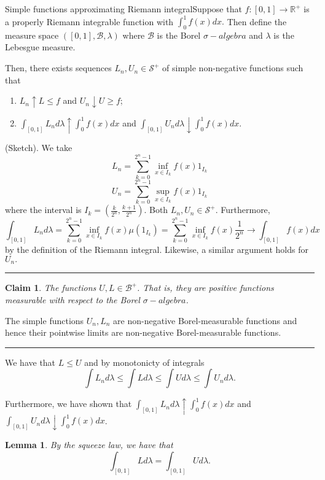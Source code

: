 \documentclass[twoside]{article}
\newtheorem{lemma}[theorem]{Lemma}
\newtheorem{claim}[theorem]{Claim}
\newenvironment{proof}{{\bf Proof:}}{\hfill\rule{2mm}{2mm}}
\newcommand{\borelsigmaalgebra}{\mathcal{B}}
\newcommand{\sa}{\sigma-algebra}
\begin{document}
\begin{proposition_exam}{Simple functions approximating Riemann integral}{}Suppose that $f: [0,1] \rightarrow \mathbb{R}^+$ is a properly Riemann integrable function with $\int_0^1f(x)dx.$ Then define the measure space $([0,1], \borelsigmaalgebra, \lambda)$ where $\borelsigmaalgebra$ is the Borel $\sa$ and $\lambda$ is the Lebesgue measure.

Then, there exists sequences $L_n, U_n \in \mathcal{S}^+$ of simple non-negative functions such that 
\begin{enumerate}
\item $L_n \uparrow L \leq f$ and $U_n \downarrow U \geq f$;
\item $\int_{[0,1]}L_nd\lambda \uparrow \int_0^1f(x)dx$ and $\int_{[0,1]}U_nd\lambda \downarrow \int_0^1f(x)dx$.
\end{enumerate}
\end{proposition_exam}

\begin{proof}(Sketch). We take 
$$
L_n = \sum_{k=0}^{2^{n}-1}\inf_{x \in I_k}f(x)1_{I_{k}}
$$
$$
U_n = \sum_{k=0}^{2^{n}-1}\sup_{x \in I_k}f(x)1_{I_{k}}
$$
where the interval is $I_k = (\frac{k}{2^n}, \frac{k+1}{2^n}).$ Both $L_n, U_n \in \mathcal{S}^+.$ Furthermore, 
$$
\int_{[0,1]}L_nd\lambda = \sum_{k=0}^{2^{n}-1}\inf_{x \in I_k}f(x)\mu(1_{I_{k}}) = \sum_{k=0}^{2^{n}-1}\inf_{x \in I_k}f(x)\frac{1}{2^n} \rightarrow \int_{[0,1]}f(x)dx
$$
by the definition of the Riemann integral. Likewise, a similar argument holds for $U_n.$
\end{proof}


\begin{claim}The functions $U,L \in \borelsigmaalgebra^+$. That is, they are positive functions measurable with respect to the Borel $\sa$.
\end{claim}
\begin{proof} The simple functions $U_n, L_n$ are non-negative Borel-measurable functions and hence their pointwise limits are non-negative Borel-measurable functions.
\end{proof}


We have that $L \leq U$ and by monotonicty of integrals 
$$
\int L_n d\lambda \leq \int L d\lambda \leq \int U d\lambda \leq \int U_n d\lambda.
$$

Furthermore, we have shown that $\int_{[0,1]}L_nd\lambda \uparrow \int_0^1f(x)dx$ and $\int_{[0,1]}U_nd\lambda \downarrow \int_0^1f(x)dx$. 

\begin{lemma}
By the squeeze law, we have that 
$$
\int_{[0,1]}Ld\lambda = \int_{[0,1]}Ud\lambda.
$$
\end{lemma}
\end{document}
